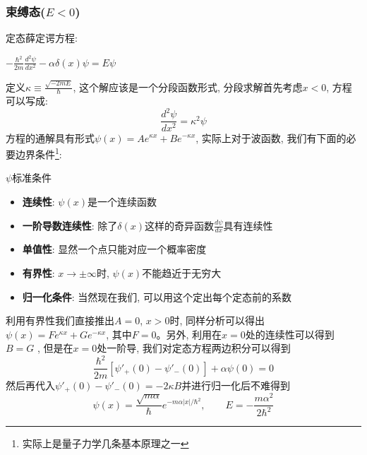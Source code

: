 \documentclass[a4paper,zihao=-4,linespread=1]{ctexrep}
\newenvironment{lequation}{\large\begin{equation}}{\end{equation}}
\begin{document}
    \subsubsection*{束缚态($E<0$)}
    定态薛定谔方程:
    \begin{center}
        \begin{math}
            \displaystyle
            -\frac{\hbar^2}{2m}\frac{d^2\psi}{dx^2}-\alpha\delta(x)\psi=E\psi
        \end{math}
    \end{center}
    定义$\kappa\equiv\frac{\sqrt{-2mE}}{\hbar}$, 这个解应该是一个分段函数形式, 分段求解首先考虑$x<0$, 方程可以写成:
    $$\frac{d^2\psi}{dx^2}=\kappa^2\psi$$方程的通解具有形式$\psi(x)=Ae^{\kappa x}+Be^{-\kappa x}$, 实际上对于波函数, 我们有下面的必要边界条件\footnote{实际上是量子力学几条基本原理之一}:
    \begin{proposition}{$\psi$标准条件}
        \begin{itemize}
            \item \textbf{连续性}: $\psi(x)$是一个连续函数
            \item \textbf{一阶导数连续性}: 除了$\delta(x)$这样的奇异函数$\frac{d\psi}{dx}$具有连续性
            \item \textbf{单值性}: 显然一个点只能对应一个概率密度
            \item \textbf{有界性}: $x\to\pm\infty$时, $\psi(x)$不能趋近于无穷大
            \item \textbf{归一化条件}: 当然现在我们, 可以用这个定出每个定态前的系数
        \end{itemize}
    \end{proposition}
    利用有界性我们直接推出$A=0$, $x>0$时, 同样分析可以得出$\psi(x)=Fe^{\kappa x}+Ge^{-\kappa x}$, 其中$F=0$。另外, 利用在$x=0$处的连续性可以得到$B=G$
    , 但是在$x=0$处一阶导, 我们对定态方程两边积分可以得到$$\frac{\hbar^2}{2m}\left[\psi'_+(0)-\psi'_-(0)\right]+\alpha\psi(0)=0$$
    然后再代入$\psi'_+(0)-\psi'_-(0)=-2\kappa B$并进行归一化后不难得到
    \begin{lequation}
        \boxed{
            \psi(x)=\frac{\sqrt{m\alpha}}{\hbar}e^{-m\alpha\left|x\right|/\hbar^2}, \qquad E=-\frac{m\alpha^2}{2\hbar^2}
        }
    \end{lequation}
    
\end{document}

